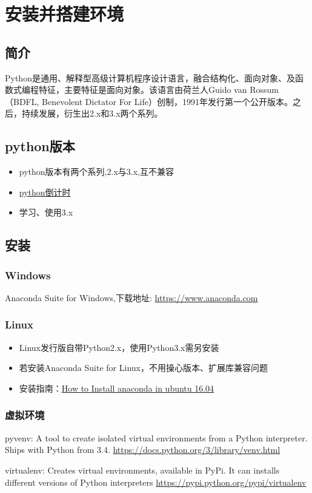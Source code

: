 \chapter{安装并搭建环境}

\section{简介}
Python是通用、解释型高级计算机程序设计语言，融合结构化、面向对象、及函数式编程特征，主要特征是面向对象。该语言由荷兰人Guido van Rossum（BDFL, Benevolent Dictator For Life）创制，1991年发行第一个公开版本。之后，持续发展，衍生出2.x和3.x两个系列。

\section{python版本}
\begin{itemize}
\item python版本有两个系列,2.x与3.x,互不兼容
\item \href{https://pythonclock.org/}{python倒计时}
\item 学习、使用3.x
\end{itemize}

\section{安装}
\subsection{Windows}
Anaconda Suite for Windows,下载地址: \url{https://www.anaconda.com}
\subsection{Linux}
\begin{itemize}
\item Linux发行版自带Python2.x，使用Python3.x需另安装
\item 若安装Anaconda Suite for Linux，不用操心版本、扩展库兼容问题
\item 安装指南：\href{https://poweruphosting.com/blog/install-anaconda-python-ubuntu-16-04/}{How to Install anaconda in ubuntu 16.04}
\end{itemize}
\subsection{虚拟环境}
\begin{description}
\item{pyvenv:} A tool to create isolated virtual environments from a Python interpreter. Ships with Python from 3.4.
\url{https://docs.python.org/3/library/venv.html}
\item{virtualenv:} Creates virtual environments, available in PyPi. It can installs different versions of Python interpreters \url{https://pypi.python.org/pypi/virtualenv}
\end{description}


